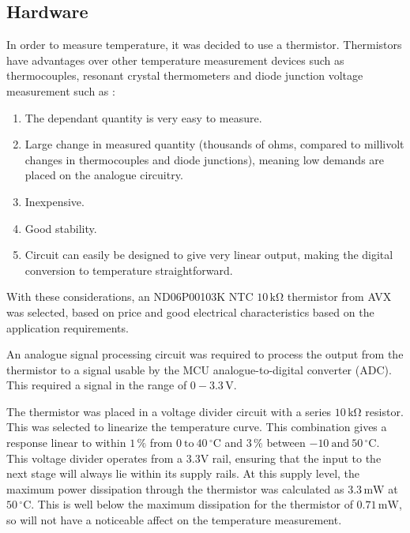 \documentclass[a4paper,10pt]{article}  %
\providecommand{\degrees}{\ensuremath{^{\circ}}}
\begin{document}

\subsection{Hardware}
\label{sec:hardware}

In order to measure temperature, it was decided to use a
thermistor. Thermistors have advantages over other temperature
measurement devices such as thermocouples, resonant crystal
thermometers and diode junction voltage measurement such as \cite{HH}: 
\begin{enumerate}
  \item The dependant quantity is very easy to measure.
  \item Large change in measured quantity (thousands of ohms, compared
    to millivolt changes in thermocouples and diode junctions), meaning
    low demands are placed on the analogue circuitry.
  \item Inexpensive.
  \item Good stability.
  \item Circuit can easily be designed to give very linear output,
    making the digital conversion to temperature straightforward.
\end{enumerate}
With these considerations, an ND06P00103K NTC $10\,\mathrm{k\Omega}$ thermistor from AVX was
selected, based on price and good electrical characteristics based on
the application requirements.

An analogue signal processing circuit was required to process the
output from the thermistor to a signal usable by the MCU
analogue-to-digital converter (ADC). This required a signal in the
range of $0-3.3\,\mathrm{V}$.

The thermistor was placed in a voltage divider circuit with a series
$10\,\mathrm{k\Omega}$ resistor. This was selected to linearize the
temperature curve. This combination gives a response linear to within
$1\,\mathrm{\%}$ from $0\ \mathrm{to}\ 40\,\mathrm{\degrees C}$ and
$3\,\mathrm{\%}$ between $-10\ \mathrm{and}\ 50\,\mathrm{\degrees
  C}$. This voltage divider operates from a 3.3V rail, ensuring that
the input to the next stage will always lie within its supply
rails. At this supply level, the maximum power dissipation through the
thermistor was calculated as $3.3\,\mathrm{mW}$ at
$50\,\mathrm{\degrees C}$. This is well below the maximum dissipation
for the thermistor of $0.71\,\mathrm{mW}$, so will not have a
noticeable affect on the temperature measurement.
\end{document}
